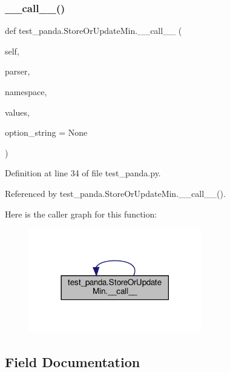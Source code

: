 \subsubsection{\texorpdfstring{\+\_\+\+\_\+call\+\_\+\+\_\+()}{\_\_call\_\_()}\hspace{0.1cm}{\footnotesize\ttfamily [3/3]}}
{\footnotesize\ttfamily def test\+\_\+panda.\+Store\+Or\+Update\+Min.\+\_\+\+\_\+call\+\_\+\+\_\+ (\begin{DoxyParamCaption}\item[{}]{self,  }\item[{}]{parser,  }\item[{}]{namespace,  }\item[{}]{values,  }\item[{}]{option\+\_\+string = {\ttfamily None} }\end{DoxyParamCaption})}



Definition at line 34 of file test\+\_\+panda.\+py.



Referenced by test\+\_\+panda.\+Store\+Or\+Update\+Min.\+\_\+\+\_\+call\+\_\+\+\_\+().

Here is the caller graph for this function\+:
\nopagebreak
\begin{figure}[H]
\begin{center}
\leavevmode
\includegraphics[width=213pt]{db/dd8/classtest__panda_1_1StoreOrUpdateMin_af8b0342a587abe4ea380c333ebe3dc73_icgraph}
\end{center}
\end{figure}


\subsection{Field Documentation}
\mbox{\label{classtest__panda_1_1StoreOrUpdateMin_a537be5d9b06664128c2a1289200607c0}} 
